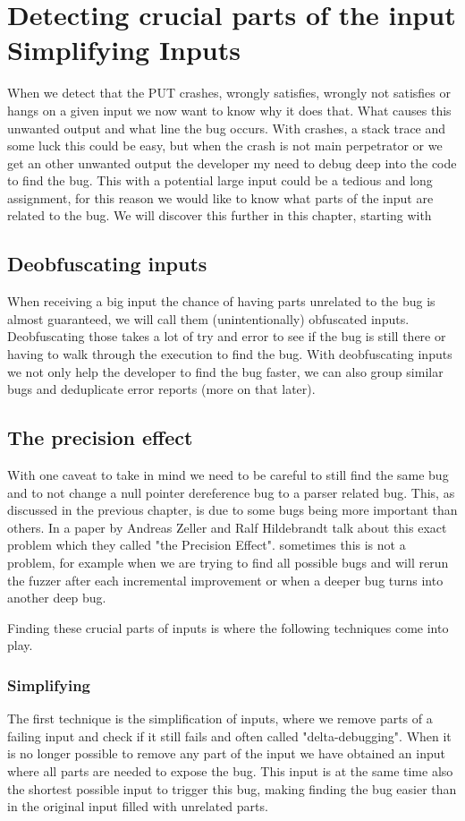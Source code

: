 \chapter{Detecting crucial parts of the input Simplifying Inputs} 
\label{cha:3}
When we detect that the PUT crashes, wrongly satisfies, wrongly not satisfies or hangs on a given input we now want to know why it does that. What causes this unwanted output and what line the bug occurs. With crashes, a stack trace and some luck this could be easy, but when the crash is not main perpetrator or we get an other unwanted output the developer my need to debug deep into the code to find the bug. This with a potential large input could be a tedious and long assignment, for this reason we would like to know what parts of the input are related to the bug. We will discover this further in this chapter, starting with 

\section{Deobfuscating inputs}
When receiving a big input the chance of having parts unrelated to the bug is almost guaranteed, we will call them (unintentionally) obfuscated inputs. Deobfuscating those takes a lot of try and error to see if the bug is still there\cite{bookZellerwhyProgramsFail} or having to walk through the execution to find the bug. With deobfuscating inputs we not only help the developer to find the bug faster, we can also group similar bugs and deduplicate error reports (more on that later). 
\section{The precision effect}
With one caveat to take in mind we need to be careful to still find the same bug and to not change a null pointer dereference bug to a parser related bug. This, as discussed in the previous chapter, is due to some bugs being more important than others. In a paper by Andreas Zeller and Ralf Hildebrandt \cite{5zeller2002simplifyingIsolatingFailure-inducing} talk about this exact problem which they called "the Precision Effect". sometimes this is not a problem, for example when we are trying to find all possible bugs and will rerun the fuzzer after each incremental improvement or when a deeper bug turns into another deep bug.

 Finding these crucial parts of inputs is where the following techniques come into play.
\subsection{Simplifying}
The first technique is the simplification of inputs, where we remove parts of a failing input and check if it still fails and often called "delta-debugging"\cite{bookZellerwhyProgramsFail}. When it is no longer possible to remove any part of the input we have obtained an input where all parts are needed to expose the bug. This input is at the same time also the shortest possible input to trigger this bug, making finding the bug easier than in the original input filled with unrelated parts.
